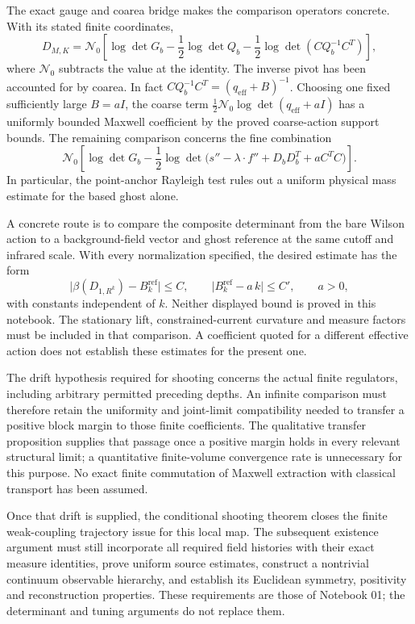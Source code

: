 \documentclass[11pt]{article}
\theoremstyle{remark}
\begin{document}
The exact gauge and coarea bridge makes the comparison
operators concrete. With its stated finite coordinates,
\[
 D_{M,K}=\mathcal N_0\!\left[
    \log\det G_b-\frac12\log\det Q_b
                 -\frac12\log\det(CQ_b^{-1}C^T)\right],
\]
where \(\mathcal N_0\) subtracts the value at the identity.
The inverse pivot has been accounted for by coarea.
In fact \(CQ_b^{-1}C^T=(q_{\mathrm{eff}}+B)^{-1}\).
Choosing one fixed sufficiently large \(B=aI\), the
coarse term \(\tfrac12\mathcal N_0\log\det(q_{\mathrm{eff}}+aI)\)
has a uniformly bounded Maxwell coefficient by the
proved coarse-action support bounds.
The remaining comparison concerns the fine combination
\[
 \mathcal N_0\!\left[
 \log\det G_b-\frac12\log\det
 \bigl(s''-\lambda\cdot f''+D_bD_b^T+aC^TC\bigr)\right].
\]
In particular, the point-anchor Rayleigh test rules out a
uniform physical mass estimate for the based ghost alone.

A concrete route is to compare the composite determinant from
the bare Wilson action to a background-field vector and ghost
reference at the same cutoff and infrared scale. With every
normalization specified, the desired estimate has the form
\[
 \bigl|\beta(D_{1,R^k})-B_k^{\mathrm{ref}}\bigr|\le C,
 \qquad
 \bigl|B_k^{\mathrm{ref}}-a\,k\bigr|\le C',
 \qquad a>0,
\]
with constants independent of \(k\). Neither displayed bound is
proved in this notebook. The stationary lift, constrained-current
curvature and measure factors must be included in that comparison.
A coefficient quoted for a different effective action does not
establish these estimates for the present one.

The drift hypothesis required for shooting concerns the actual
finite regulators, including arbitrary permitted preceding depths.
An infinite comparison must therefore retain the uniformity and
joint-limit compatibility needed to transfer a positive block
margin to those finite coefficients. The qualitative transfer
proposition supplies that passage once a positive margin holds
in every relevant structural limit; a quantitative
finite-volume convergence rate is unnecessary for this purpose.
No exact finite commutation of Maxwell extraction with classical
transport has been assumed.

Once that drift is supplied, the conditional shooting theorem
closes the finite weak-coupling trajectory issue for this local
map. The subsequent existence argument must still incorporate
all required field histories with their exact measure identities,
prove uniform source estimates, construct a nontrivial continuum
observable hierarchy, and establish its Euclidean symmetry,
positivity and reconstruction properties. These requirements are
those of Notebook 01; the determinant and tuning arguments do not
replace them.
\end{document}
